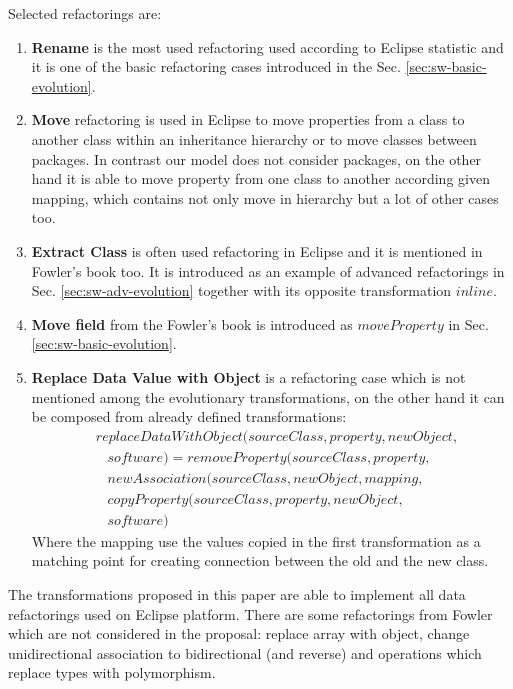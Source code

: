 \documentclass[runningheads]{comsis}
\begin{document}
Selected refactorings are:
\begin{enumerate}
	\item \textbf{Rename} is the most used refactoring used according to Eclipse statistic and it is one of the basic refactoring cases introduced in the Sec. \ref{sec:sw-basic-evolution}.
	\item  \textbf{Move} refactoring is used in Eclipse to move properties from a class to another class within an inheritance hierarchy or to move classes between packages. In contrast our model does not consider packages, on the other hand it is able to move property from one class to another according given mapping, which contains not only move in hierarchy but a lot of other cases too.
	\item \textbf{Extract Class} is often used refactoring in Eclipse and it is mentioned in Fowler's book too. It is introduced as an example of advanced refactorings in Sec. \ref{sec:sw-adv-evolution} together with its opposite transformation $inline$.
	\item \textbf{Move field} from the Fowler's book is introduced as $moveProperty$ in Sec. \ref{sec:sw-basic-evolution}.
	\item \textbf{Replace Data Value with Object} is a refactoring case which is not mentioned among the evolutionary transformations, on the other hand it can be composed from already defined transformations:
	\begin{align}
& replaceDataWithObject(sourceClass, property, newObject, \nonumber \\
& \; \; \; software) = removeProperty(sourceClass, property, \nonumber \\
& \; \; \; newAssociation(sourceClass, newObject,  mapping,\nonumber  \\
& \; \; \; copyProperty(sourceClass, property, newObject, \nonumber \\ & \; \; \;  software)
	\end{align}
Where the mapping use the values copied in the first transformation as a matching point for creating connection between the old and the new class.
\end{enumerate}
The transformations proposed in this paper are able to implement all data refactorings used on Eclipse platform. There are some refactorings from Fowler which are not considered in the proposal: replace array with object, change unidirectional association to bidirectional (and reverse) and operations which replace types with polymorphism.
\end{document}
